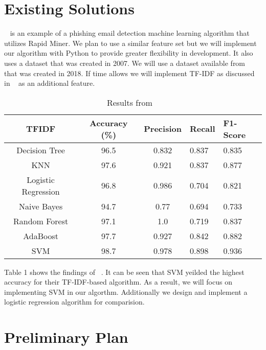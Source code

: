 \documentclass[10pt,twocolumn,letterpaper]{article}
\begin{document}
\section{Existing Solutions}

~\cite{diego} is an example of a phishing email detection machine learning algorithm that utilizes Rapid Miner. We plan to use a similar feature set but we will implement our algorithm with Python to provide greater flexibility in development. It also uses a dataset that was created in 2007. We will use a dataset available from ~\cite{monkey} that was created in 2018. If time allows we will implement TF-IDF as discussed in ~\cite{CENreport} as an additional feature.

\pagebreak

\begin{table}
\begin{center}
\begin{tabular}{|c|c|c|l|l|}
\hline
TFIDF & Accuracy (\%) & Precision & Recall & F1-Score\\
\hline
Decision Tree & 96.5 & 0.832 & 0.837 & 0.835\\
\hline
KNN & 97.6 & 0.921 & 0.837 & 0.877\\
\hline
Logistic Regression & 96.8 & 0.986 & 0.704 & 0.821\\
\hline
Naive Bayes & 94.7 & 0.77 & 0.694 & 0.733\\
\hline
Random Forest& 97.1 & 1.0 & 0.719 & 0.837\\
\hline
AdaBoost & 97.7 & 0.927 & 0.842 & 0.882\\
\hline
SVM & 98.7 & 0.978 & 0.898 & 0.936\\
\hline
\end{tabular}
\end{center}
\caption{Results from ~\cite{CENreport}}
\end{table}

Table 1 shows the findings of ~\cite{CENreport}. It can be seen that SVM yeilded the highest accuracy for their TF-IDF-based algorithm. As a result, we will focus on implementing SVM in our algorthm. Additionally we design and implement a logistic regression algorithm for comparision. 

\section{Preliminary Plan}
\end{document}
